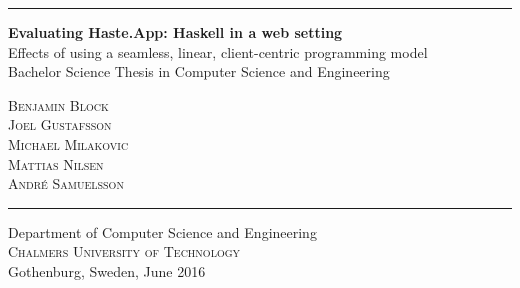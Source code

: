 \documentclass[a4paper]{article}
\begin{document}

\begin{titlepage}

\addtolength{\voffset}{2cm}
\vspace*{-1.75cm}
\rule{\linewidth}{1pt}




\mbox{}
\vfill
\renewcommand{\familydefault}{\sfdefault} \normalfont %
\textbf{{\huge Evaluating Haste.App: Haskell in a web setting}}   \\[0.5cm]
{\Large Effects of using a seamless, linear, client-centric programming model}\\[0.5cm]
Bachelor Science Thesis in Computer Science and Engineering \setlength{\parskip}{1cm}



{\Large \textsc{Benjamin Block}} \setlength{\parskip}{2.9cm}\\
{\Large \textsc{Joel Gustafsson}} \setlength{\parskip}{2.9cm}\\
{\Large \textsc{Michael Milakovic}} \setlength{\parskip}{2.9cm}\\
{\Large \textsc{Mattias Nilsen}} \setlength{\parskip}{2.9cm}\\
{\Large \textsc{André Samuelsson}} \setlength{\parskip}{2.9cm}

\vfill
\vspace*{-1.75cm}
\rule{\linewidth}{1pt}
Department of Computer Science and Engineering \\
\textsc{Chalmers University of Technology} \\
Gothenburg, Sweden, June 2016

\renewcommand{\familydefault}{\rmdefault} \normalfont %
\end{titlepage}
\restoregeometry
\newpage\null\thispagestyle{empty}\newpage
\end{document}
